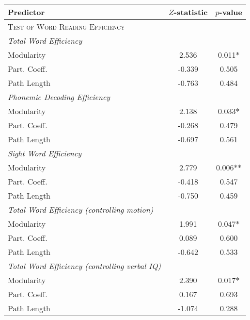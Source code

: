 \begin{tabular}{lcc}
\toprule
Predictor   &  $Z$-statistic &  $p$-value \\
\midrule
\textsc{Test of Word Reading Efficiency} & & \\
\textit{Total Word Efficiency} & & \\
    \hspace{5pt}Modularity &  2.536 &  0.011* \\
    \hspace{5pt}Part. Coeff. & -0.339 &  0.505 \\
    \hspace{5pt}Path Length & -0.763 &  0.484 \\
\textit{Phonemic Decoding Efficiency} & & \\
    \hspace{5pt}Modularity  &  2.138 &  0.033* \\
    \hspace{5pt}Part. Coeff. & -0.268 &  0.479 \\
    \hspace{5pt}Path Length & -0.697 &  0.561 \\
\textit{Sight Word Efficiency} & & \\
    \hspace{5pt}Modularity  &  2.779 &  0.006** \\
    \hspace{5pt}Part. Coeff. & -0.418 &  0.547 \\
    \hspace{5pt}Path Length & -0.750 &  0.459 \\
\textit{Total Word Efficiency (controlling motion)} & & \\
    \hspace{5pt}Modularity  &  1.991 &  0.047* \\
    \hspace{5pt}Part. Coeff. &  0.089 &  0.600 \\
    \hspace{5pt}Path Length & -0.642 &  0.533 \\
\textit{Total Word Efficiency (controlling verbal IQ)} & & \\
    \hspace{5pt}Modularity  &  2.390 &  0.017* \\
    \hspace{5pt}Part. Coeff. &  0.167 &  0.693 \\
    \hspace{5pt}Path Length & -1.074 &  0.288 \\
\bottomrule
\end{tabular}
